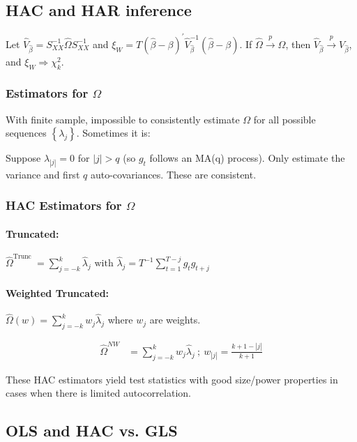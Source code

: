 \subsection{HAC and HAR inference}

Let $\hat{V}_{\widehat{\beta}}=S_{X X}^{-1} \hat{\Omega} S_{X X}^{-1}$ and $\xi_W=T(\hat{\beta}-\beta)^{\prime} \hat{V}_{\hat{\beta}}^{-1}(\hat{\beta}-\beta)$.
If $\hat{\Omega} \stackrel{p}{\longrightarrow} \Omega$, then $\hat{V}_{\hat{\beta}} \stackrel{p}{\longrightarrow} V_{\hat{\beta}}$, and $\xi_W \Rightarrow \chi_k^2$.

\subsubsection{Estimators for $\Omega$}

With finite sample, impossible to consistently estimate $\Omega$ for all possible sequences $\left\{\lambda_j\right\}$. Sometimes it is:

Suppose $\lambda_{|j|}=0$ for $|j|>q$ (so $g_t$ follows an MA(q) process). Only estimate the variance and first $q$ auto-covariances. These are consistent.

\subsubsection{HAC Estimators for $\Omega$}

\paragraph{Truncated: } $\hat{\Omega}^{\text {Trunc }}=\sum_{j=-k}^k \hat{\lambda}_j \text { with } \hat{\lambda}_j=T^{-1} \sum_{t=1}^{T-j} g_t g_{t+j}$

\paragraph{Weighted Truncated: } $\hat{\Omega}(w)=\sum_{j=-k}^k w_j \hat{\lambda}_j$ where $w_j$ are weights.

\begin{align*}
    \hat{\Omega}^{N W}&=\sum_{j=-k}^k w_j \hat{\lambda}_j \: ; \:
    w_{|j|}=\frac{k+1-|j|}{k+1}
\end{align*}

These HAC estimators yield test statistics with good size/power properties in cases when there is
limited autocorrelation.

\subsection{OLS and HAC vs. GLS}

